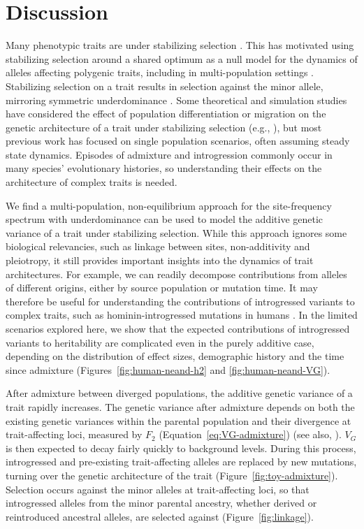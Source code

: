 \documentclass[10pt,letterpaper]{article}
\begin{document}
\section*{Discussion}

Many phenotypic traits are under stabilizing selection \cite{hodgins2015gene,
sanjak2018evidence, sella2019thinking}. This has motivated using stabilizing
selection around a shared optimum as a null model for the dynamics of alleles
affecting polygenic traits, including in multi-population settings
\cite{yair2022population}. Stabilizing selection on a trait results in
selection against the minor allele, mirroring symmetric underdominance
\cite{robertson1956effect, keightley1988quantitative}. Some theoretical and
simulation studies have considered the effect of population differentiation or
migration on the genetic architecture of a trait under stabilizing selection
(e.g., \cite{tufto2000quantitative, yeaman2011genetic, yair2022population}),
but most previous work has focused on single population scenarios, often
assuming steady state dynamics. Episodes of admixture and introgression
commonly occur in many species' evolutionary histories, so understanding their
effects on the architecture of complex traits is needed.

We find a multi-population, non-equilibrium approach for the site-frequency
spectrum with underdominance can be used to model the additive genetic variance
of a trait under stabilizing selection. While this approach ignores some
biological relevancies, such as linkage between sites, non-additivity and
pleiotropy, it still provides important insights into the dynamics of trait
architectures. For example, we can readily decompose contributions from alleles
of different origins, either by source population or mutation time. It may
therefore be useful for understanding the contributions of introgressed
variants to complex traits, such as hominin-introgressed mutations in humans
\cite{reilly2022contribution, wei2023lingering}. In the limited scenarios
explored here, we show that the expected contributions of introgressed variants
to heritability are complicated even in the purely additive case, depending on
the distribution of effect sizes, demographic history and the time since
admixture (Figures~\ref{fig:human-neand-h2} and \ref{fig:human-neand-VG}).

After admixture between diverged populations, the additive genetic variance of
a trait rapidly increases. The genetic variance after admixture depends on both
the existing genetic variances within the parental population and their
divergence at trait-affecting loci, measured by $F_2$
(Equation~\ref{eq:VG-admixture}) (see also, \cite{veller2024stabilizing}).
$V_G$ is then expected to decay fairly quickly to background levels. During
this process, introgressed and pre-existing trait-affecting alleles are
replaced by new mutations, turning over the genetic architecture of the trait
(Figure~\ref{fig:toy-admixture}). Selection occurs against the minor alleles at
trait-affecting loci, so that introgressed alleles from the minor parental
ancestry, whether derived or reintroduced ancestral alleles, are selected
against (Figure~\ref{fig:linkage}).
\end{document}
